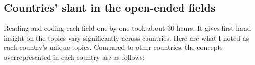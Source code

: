 \clearpage
\subsection{Countries' slant in the open-ended fields}\label{subsec:slant}
Reading and coding each field one by one took about 30 hours. %
It gives first-hand insight on the topics vary significantly across countries. 
Here are what I noted as %
each country's unique topics. %
Compared to other countries, the concepts overrepresented in each country are as follows:
